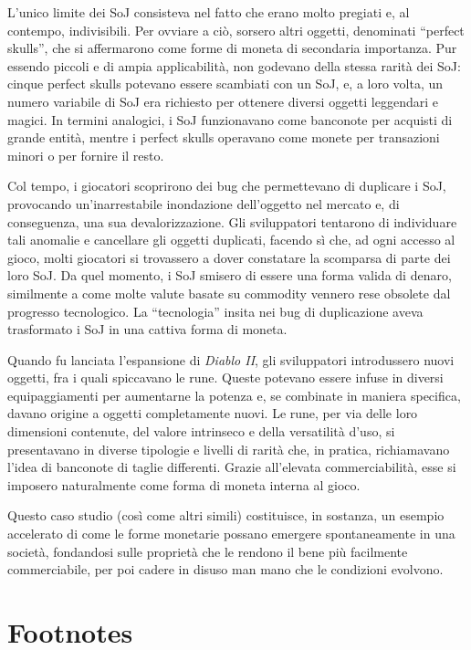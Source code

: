 \documentclass[
  a5paper,
  smalldemyvopaper,10pt,twoside,onecolumn,openright,extrafontsizes,hidelinks]{memoir}
\begin{document}
L'unico limite dei SoJ consisteva nel fatto che erano molto pregiati e,
al contempo, indivisibili. Per ovviare a ciò, sorsero altri oggetti,
denominati ``perfect skulls'', che si affermarono come forme di moneta
di secondaria importanza. Pur essendo piccoli e di ampia applicabilità,
non godevano della stessa rarità dei SoJ: cinque perfect skulls potevano
essere scambiati con un SoJ, e, a loro volta, un numero variabile di SoJ
era richiesto per ottenere diversi oggetti leggendari e magici. In
termini analogici, i SoJ funzionavano come banconote per acquisti di
grande entità, mentre i perfect skulls operavano come monete per
transazioni minori o per fornire il resto.

Col tempo, i giocatori scoprirono dei bug che permettevano di duplicare
i SoJ, provocando un'inarrestabile inondazione dell'oggetto nel mercato
e, di conseguenza, una sua devalorizzazione. Gli sviluppatori tentarono
di individuare tali anomalie e cancellare gli oggetti duplicati, facendo
sì che, ad ogni accesso al gioco, molti giocatori si trovassero a dover
constatare la scomparsa di parte dei loro SoJ. Da quel momento, i SoJ
smisero di essere una forma valida di denaro, similmente a come molte
valute basate su commodity vennero rese obsolete dal progresso
tecnologico. La ``tecnologia'' insita nei bug di duplicazione aveva
trasformato i SoJ in una cattiva forma di moneta.

Quando fu lanciata l'espansione di \emph{Diablo II}, gli sviluppatori
introdussero nuovi oggetti, fra i quali spiccavano le rune. Queste
potevano essere infuse in diversi equipaggiamenti per aumentarne la
potenza e, se combinate in maniera specifica, davano origine a oggetti
completamente nuovi. Le rune, per via delle loro dimensioni contenute,
del valore intrinseco e della versatilità d'uso, si presentavano in
diverse tipologie e livelli di rarità che, in pratica, richiamavano
l'idea di banconote di taglie differenti. Grazie all'elevata
commerciabilità, esse si imposero naturalmente come forma di moneta
interna al gioco.

Questo caso studio (così come altri simili) costituisce, in sostanza, un
esempio accelerato di come le forme monetarie possano emergere
spontaneamente in una società, fondandosi sulle proprietà che le rendono
il bene più facilmente commerciabile, per poi cadere in disuso man mano
che le condizioni evolvono.

\section{Footnotes}\label{footnotes-2}
\end{document}
